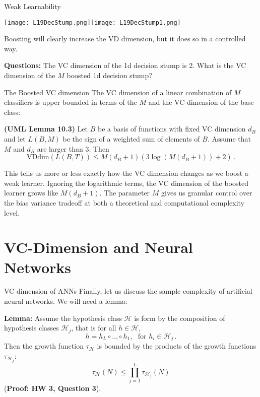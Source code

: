 \documentclass[10pt, table, dvipsnames, handout]{beamer}
\newcommand{\cH}{\ensuremath{\mathcal{H}}}
\begin{document}
\begin{frame}[fragile]{Weak Learnability}
  \begin{minipage}[t][0.5\textheight][t]{\textwidth}
	\centering \texttt{[image: L19DecStump.png]}\hspace{1em}\texttt{[image: L19DecStump1.png]} 
  \end{minipage}
  \vfill
\begin{minipage}[t][0.5\textheight][t]{\textwidth}
Boosting will clearly increase the VD dimension, but it does so in a controlled way. 

\textbf{Questions:} The VC dimension of the 1d decision stump is 2. What is the VC dimension of the $M$ boosted 1d decision stump?
\end{minipage}
\end{frame}




\begin{frame}[fragile]{The Boosted VC dimension}
The VC dimension of a linear combination of $M$ classifiers is upper bounded in terms of the $M$ and the VC dimension of the base class:\pause

\textbf{(UML Lemma 10.3)} Let $B$ be a basis of functions with fixed VC dimension $d_B$ and let $L(B,M)$ be the sign of a weighted sum of elements of $B$. Assume that $M$ and $d_B$ are larger than 3. Then 
$$
\text{VDdim}(L(B,T)) \leq M(d_B + 1)(3\log(M(d_B+1))+2)\,.
$$\pause

This tells us more or less exactly how the VC dimension changes as we boost a weak learner. Ignoring the logarithmic terms, the VC dimension of the boosted learner grows like $M(d_B + 1)$. The parameter $M$ gives us granular control over the bias variance tradeoff at both a theoretical and computational complexity level. 
\end{frame}




\section{VC-Dimension and Neural Networks}


\begin{frame}[fragile]{VC dimension of ANNs}
Finally, let us discuss the sample complexity of artificial neural networks. We will need a lemma:\pause

\textbf{Lemma:} Assume the hypothesis class $\cH$ is form by the composition of hypothesis classes $\cH_j$, that is for all $h\in \cH$,
$$
h = h_L\circ\ldots \circ h_1,\,\,\,\,\text{for } h_i\in \cH_j\,.
$$
Then the growth function $\tau_\cH$ is bounded by the products of the growth functions $\tau_{\cH_j}$:
$$
\tau_\cH(N) \leq \prod_{j=1}^L \tau_{\cH_j}(N)
$$
 (\textbf{Proof: HW 3, Question 3}).

\end{frame}
\end{document}

